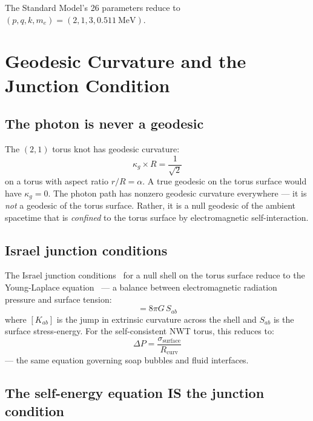 \documentclass[11pt,a4paper]{article}
\begin{document}
The Standard Model's 26 parameters reduce to $(p, q, k, m_e) = (2, 1, 3, 0.511~\text{MeV})$.

\section{Geodesic Curvature and the Junction Condition}
\label{sec:junction}

\subsection{The photon is never a geodesic}

The $(2,1)$ torus knot has geodesic curvature:
\begin{equation}
  \kappa_g \times R = \frac{1}{\sqrt{2}}
\end{equation}
on a torus with aspect ratio $r/R = \alpha$. A true geodesic on the torus surface would have $\kappa_g = 0$. The photon path has nonzero geodesic curvature everywhere --- it is \emph{not} a geodesic of the torus surface. Rather, it is a null geodesic of the ambient spacetime that is \emph{confined} to the torus surface by electromagnetic self-interaction.

\subsection{Israel junction conditions}

The Israel junction conditions~\cite{israel1966} for a null shell on the torus surface reduce to the Young-Laplace equation~\cite{young1805,laplace1805} --- a balance between electromagnetic radiation pressure and surface tension:
\begin{equation}
  [K_{ab}] = 8\pi G\, S_{ab}
\end{equation}
where $[K_{ab}]$ is the jump in extrinsic curvature across the shell and $S_{ab}$ is the surface stress-energy. For the self-consistent NWT torus, this reduces to:
\begin{equation}
  \Delta P = \frac{\sigma_{\text{surface}}}{R_{\text{curv}}}
\end{equation}
--- the same equation governing soap bubbles and fluid interfaces.

\subsection{The self-energy equation IS the junction condition}
\end{document}
